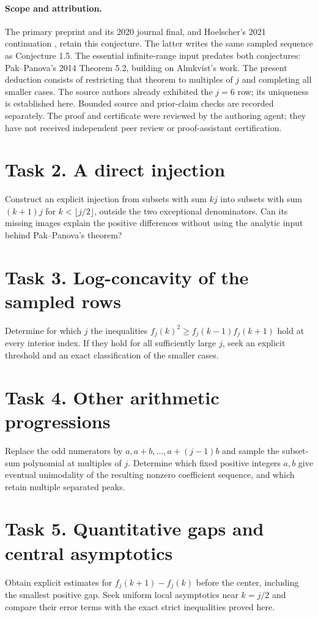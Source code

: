 \documentclass[11pt]{article}
\begin{document}
\newpage
\paragraph{Scope and attribution.}
The primary preprint and its 2020 journal final, and Hoelscher's 2021
continuation \cite{H}, retain this conjecture. The latter writes the same
sampled sequence as Conjecture 1.5. The essential infinite-range input
predates both conjectures: Pak--Panova's 2014 Theorem 5.2, building on
Almkvist's work. The present deduction consists of restricting that
theorem to multiples of $j$ and completing all smaller cases. The source
authors already exhibited the $j=6$ row; its uniqueness is established
here. Bounded source and prior-claim checks are recorded separately.
The proof and certificate were reviewed by the authoring agent; they
have not received independent peer review or proof-assistant certification.

\section*{Task 2. A direct injection}
Construct an explicit injection from subsets with sum $kj$ into
subsets with sum $(k+1)j$ for $k<\lfloor j/2\rfloor$, outside the two
exceptional denominators. Can its missing images explain the positive
differences without using the analytic input behind Pak--Panova's theorem?

\section*{Task 3. Log-concavity of the sampled rows}
Determine for which $j$ the inequalities
$f_j(k)^2\ge f_j(k-1)f_j(k+1)$ hold at every interior index.
If they hold for all sufficiently large $j$, seek an explicit threshold
and an exact classification of the smaller cases.

\section*{Task 4. Other arithmetic progressions}
Replace the odd numerators by $a,a+b,\ldots,a+(j-1)b$ and sample the
subset-sum polynomial at multiples of $j$. Determine which fixed positive
integers $a,b$ give eventual unimodality of the resulting nonzero
coefficient sequence, and which retain multiple separated peaks.

\section*{Task 5. Quantitative gaps and central asymptotics}
Obtain explicit estimates for $f_j(k+1)-f_j(k)$ before the center,
including the smallest positive gap. Seek uniform local asymptotics
near $k=j/2$ and compare their error terms with the exact strict
inequalities proved here.
\end{document}
